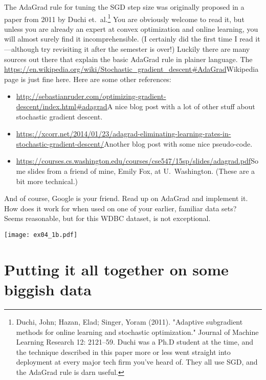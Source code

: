 \documentclass{article}
\begin{document}
\begin{enumerate}[(A)]
The AdaGrad rule for tuning the SGD step size was originally proposed in a paper from 2011 by Duchi et.~al.\footnote{Duchi, John; Hazan, Elad; Singer, Yoram (2011). "Adaptive subgradient methods for online learning and stochastic optimization."  Journal of Machine Learning Research 12: 2121--59.  Duchi was a Ph.D student at the time, and the technique described in this paper more or less went straight into deployment at every major tech firm you've heard of.  They all use SGD, and the AdaGrad rule is darn useful.}  You are obviously welcome to read it, but unless you are already an expert at convex optimization and online learning, you will almost surely find it incomprehensible.  (I certainly did the first time I read it---although try revisiting it after the semester is over!)  Luckily there are many sources out there that explain the basic AdaGrad rule in plainer language.  The \url{https://en.wikipedia.org/wiki/Stochastic_gradient_descent#AdaGrad}{Wikipedia page} is just fine here.  Here are some other references:
\begin{itemize}
\item \url{http://sebastianruder.com/optimizing-gradient-descent/index.html#adagrad}{A nice blog post} with a lot of other stuff about stochastic gradient descent.
\item \url{https://xcorr.net/2014/01/23/adagrad-eliminating-learning-rates-in-stochastic-gradient-descent/}{Another blog post} with some nice pseudo-code.
\item \url{https://courses.cs.washington.edu/courses/cse547/15sp/slides/adagrad.pdf}{Some slides from a friend of mine}, Emily Fox, at U.~Washington.  (These are a bit more technical.)
\end{itemize}
And of course, Google is your friend.  Read up on AdaGrad and implement it.  How does it work for when used on one of your earlier, familiar data sets?
\\
\color{blue}
Seems reasonable, but for this WDBC dataset, is not exceptional. 
\begin{center}
\texttt{[image: ex04\_1b.pdf]}
\end{center}
\color{black}

\end{enumerate}


\section{Putting it all together on some biggish data}
\end{document}
